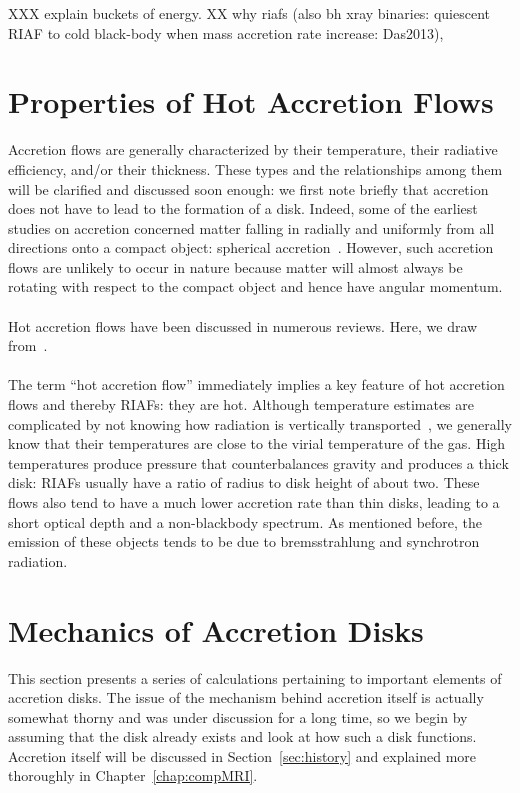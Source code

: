 XXX explain buckets of energy.
XX why riafs (also bh xray binaries: quiescent RIAF to cold black-body when mass accretion rate increase: Das2013), 


\section{Properties of Hot Accretion Flows} \label{sec:propertiesAF}
Accretion flows are generally characterized by their temperature, their radiative efficiency, and/or their thickness. These types and the relationships among them will be clarified and discussed soon enough: we first note briefly that accretion does not have to lead to the formation of a disk. Indeed, some of the earliest studies on accretion concerned matter falling in radially and uniformly from all directions onto a compact object: spherical accretion~\cite{Bondi?XX}. However, such accretion flows are unlikely to occur in nature because matter will almost always be rotating with respect to the compact object and hence have angular momentum. \\
\\
Hot accretion flows have been discussed in numerous reviews. Here, we draw from~\citet{Yuan2014}. \\
\\
The term ``hot accretion flow'' immediately implies a key feature of hot accretion flows and thereby RIAFs: they are hot. Although temperature estimates are complicated by not knowing how radiation is vertically transported~\cite{BH1998}, we generally know that their temperatures are close to the virial temperature of the gas. High temperatures produce pressure that counterbalances gravity and produces a thick disk: RIAFs usually have a ratio of radius to disk height of about two. These flows also tend to have a much lower accretion rate than thin disks, leading to a short optical depth and a non-blackbody spectrum. As mentioned before, the emission of these objects tends to be due to bremsstrahlung and synchrotron radiation. 




\section{Mechanics of Accretion Disks}\label{sec:mechanics}
This section presents a series of calculations pertaining to important elements of accretion disks. The issue of the mechanism behind accretion itself is actually somewhat thorny and was under discussion for a long time, so we begin by assuming that the disk already exists and look at how such a disk functions. Accretion itself will be discussed in Section~\ref{sec:history} and explained more thoroughly in Chapter~\ref{chap:compMRI}. 

